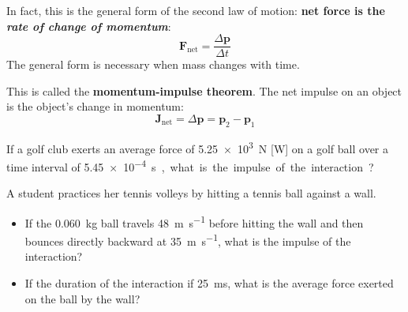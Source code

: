 In fact, this is the general form of the second law of motion: \textbf{net
  force is the \emph{rate of change of momentum}}:
\begin{equation}
  \boxed{
    \bm F_\text{net}=\frac{\Delta\bm p}{\Delta t}
  }
\end{equation}  
The general form is necessary when mass changes with time.
%
%
%
%
%

This is called the \textbf{momentum-impulse theorem}. The net
impulse %
on an object is the object's change in momentum:
\begin{equation}
  \boxed{
    \bm J_\text{net}=\Delta\bm p=\bm p_2-\bm p_1
  }      
\end{equation}



\begin{example}
  If a golf club exerts an average force of \SI{5.25e3}{\newton} [W] on a golf
  ball over a time interval of \SI{5.45e-4}\second, what is the impulse of the
  interaction?
\end{example}
%
%
%

%




\begin{example}
  A student practices her tennis volleys by hitting a tennis ball against a
  wall.
  \begin{itemize}
  \item If the \SI{.060}{\kilo\gram} ball travels \SI{48}{\metre\per\second}
    before hitting the wall and then bounces directly backward at
    \SI{35}{\metre\per\second}, what is the impulse of the interaction?
  \item If the duration of the interaction if \SI{25}{\milli\second}, what is
    the average force exerted on the ball by the wall?
  \end{itemize}
\end{example}



